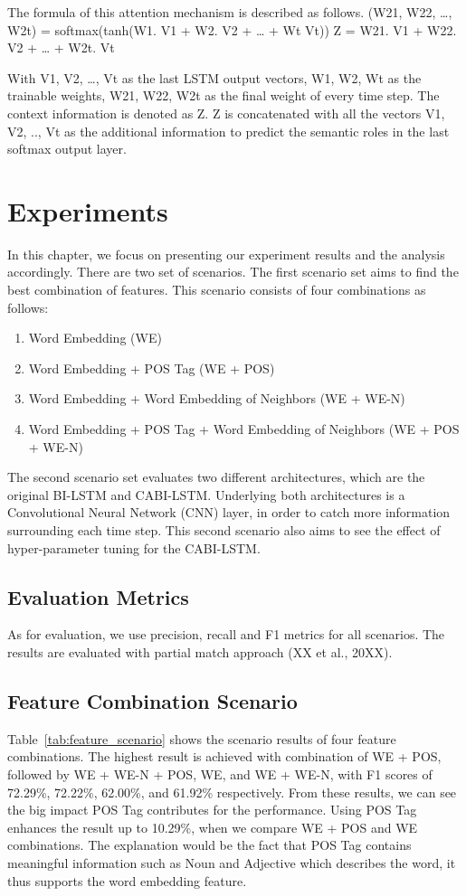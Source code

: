 The formula of this attention mechanism is described as follows.
(W21, W22, …, W2t) = softmax(tanh(W1. V1 + W2. V2 + … + Wt Vt))
Z = W21. V1 + W22. V2 + … + W2t. Vt

With V1, V2, …, Vt as the last LSTM output vectors, W1, W2, Wt as the trainable weights, W21, W22, W2t as the final weight of every time step. The context information is denoted as Z. Z is concatenated with all the vectors V1, V2, .., Vt as the additional information to predict the semantic roles in the last softmax output layer.

\section{Experiments}
In this chapter, we focus on presenting our experiment results and the analysis accordingly. There are two set of scenarios. The first scenario set aims to find the best combination of features. This scenario consists of four combinations as follows:

\begin{enumerate}
	\item Word Embedding (WE)
	\item Word Embedding + POS Tag (WE + POS)
	\item Word Embedding + Word Embedding of Neighbors (WE + WE-N)
	\item Word Embedding + POS Tag + Word Embedding of Neighbors (WE + POS + WE-N)
\end{enumerate}

The second scenario set evaluates two different architectures, which are the original BI-LSTM and CABI-LSTM. Underlying both architectures is a Convolutional Neural Network (CNN) layer, in order to catch more information surrounding each time step. This second scenario also aims to see the effect of hyper-parameter tuning for the CABI-LSTM.

\subsection{Evaluation Metrics}
As for evaluation, we use precision, recall and F1 metrics for all scenarios. The results are evaluated with partial match approach (XX et al., 20XX).

\subsection{Feature Combination Scenario}
Table~\ref{tab:feature_scenario} shows the scenario results of four feature combinations. The highest result is achieved with combination of WE + POS, followed by WE + WE-N + POS, WE, and WE + WE-N, with F1 scores of 72.29\%, 72.22\%, 62.00\%, and 61.92\% respectively. From these results, we can see the big impact POS Tag contributes for the performance. Using POS Tag enhances the result up to 10.29\%, when we compare WE + POS and WE combinations. The explanation would be the fact that POS Tag contains meaningful information such as Noun and Adjective which describes the word, it thus supports the word embedding feature.

